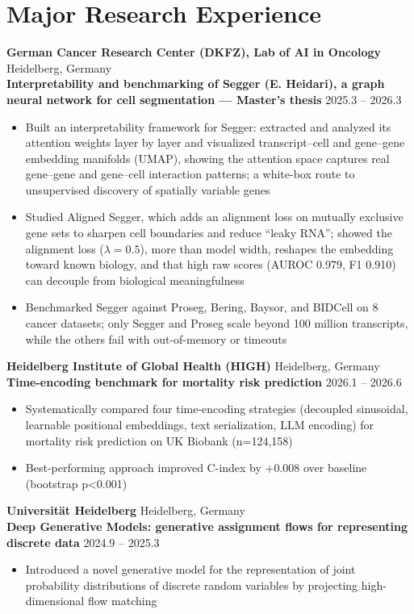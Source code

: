 \documentclass[10.5pt,letterpaper]{article}
\newcommand{\subentrytitle}[2]{%
  \textbf{#1} \hfill #2\\[1pt]
}
\begin{document}
\section*{Major Research Experience}

\subentrytitle{German Cancer Research Center (DKFZ), Lab of AI in Oncology}{Heidelberg, Germany}
\subentrytitle{Interpretability and benchmarking of Segger (E. Heidari), a graph neural network for cell segmentation --- Master's thesis}{2025.3 -- 2026.3}
\begin{itemize}[leftmargin=18pt,itemsep=1pt,topsep=2pt]
  \item Built an interpretability framework for Segger: extracted and analyzed its attention weights layer by layer and visualized transcript--cell and gene--gene embedding manifolds (UMAP), showing the attention space captures real gene--gene and gene--cell interaction patterns; a white-box route to unsupervised discovery of spatially variable genes
  \item Studied Aligned Segger, which adds an alignment loss on mutually exclusive gene sets to sharpen cell boundaries and reduce ``leaky RNA''; showed the alignment loss ($\lambda=0.5$), more than model width, reshapes the embedding toward known biology, and that high raw scores (AUROC 0.979, F1 0.910) can decouple from biological meaningfulness
  \item Benchmarked Segger against Proseg, Bering, Baysor, and BIDCell on 8 cancer datasets; only Segger and Proseg scale beyond 100 million transcripts, while the others fail with out-of-memory or timeouts
\end{itemize}

\subentrytitle{Heidelberg Institute of Global Health (HIGH)}{Heidelberg, Germany}
\subentrytitle{Time-encoding benchmark for mortality risk prediction}{2026.1 -- 2026.6}
\begin{itemize}[leftmargin=18pt,itemsep=1pt,topsep=2pt]
  \item Systematically compared four time-encoding strategies (decoupled sinusoidal, learnable positional embeddings, text serialization, LLM encoding) for mortality risk prediction on UK Biobank (n=124,158)
  \item Best-performing approach improved C-index by +0.008 over baseline (bootstrap p\textless0.001)
\end{itemize}

\subentrytitle{Universit\"at Heidelberg}{Heidelberg, Germany}
\subentrytitle{Deep Generative Models: generative assignment flows for representing discrete data}{2024.9 -- 2025.3}
\begin{itemize}[leftmargin=18pt,itemsep=1pt,topsep=2pt]
  \item Introduced a novel generative model for the representation of joint probability distributions of discrete random variables by projecting high-dimensional flow matching
\end{itemize}
\end{document}
